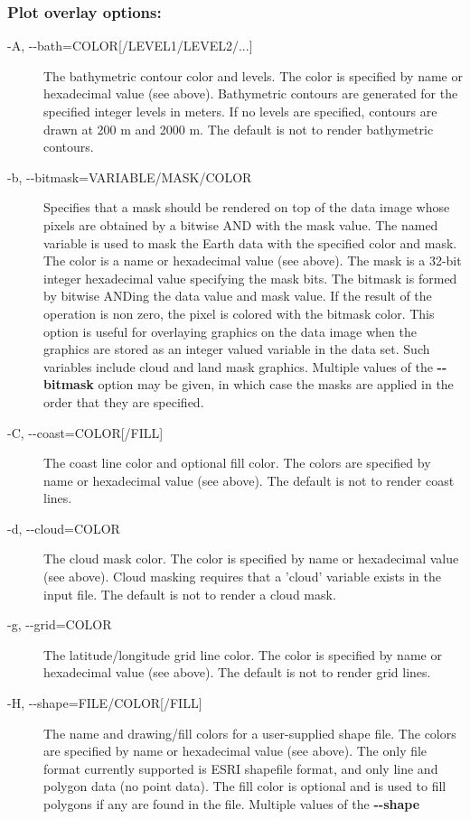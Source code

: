 \subsubsection*{Plot overlay options:}
\begin{description}
\item[-A, -{-}bath=COLOR[/LEVEL1/LEVEL2/...{]}]The bathymetric contour color and levels. The color is specified by name or hexadecimal value (see above). Bathymetric contours are generated for the specified integer levels in meters. If no levels are specified, contours are drawn at 200 m and 2000 m. The default is not to render bathymetric contours.
\item[-b, -{-}bitmask=VARIABLE/MASK/COLOR]Specifies that a mask should be rendered on top of the data image whose pixels are obtained by a bitwise AND with the mask value. The named variable is used to mask the Earth data with the specified color and mask. The color is a name or hexadecimal value (see above). The mask is a 32-bit integer hexadecimal value specifying the mask bits. The bitmask is formed by bitwise ANDing the data value and mask value. If the result of the operation is non zero, the pixel is colored with the bitmask color. This option is useful for overlaying graphics on the data image when the graphics are stored as an integer valued variable in the data set. Such variables include cloud and land mask graphics. Multiple values of the \textbf{-{-}bitmask}
 option may be given, in which case the masks are applied in the order that they are specified.
\item[-C, -{-}coast=COLOR[/FILL{]}]The coast line color and optional fill color. The colors are specified by name or hexadecimal value (see above). The default is not to render coast lines.
\item[-d, -{-}cloud=COLOR]The cloud mask color. The color is specified by name or hexadecimal value (see above). Cloud masking requires that a 'cloud' variable exists in the input file. The default is not to render a cloud mask.
\item[-g, -{-}grid=COLOR]The latitude/longitude grid line color. The color is specified by name or hexadecimal value (see above). The default is not to render grid lines.
\item[-H, -{-}shape=FILE/COLOR[/FILL{]}]The name and drawing/fill colors for a user-supplied shape file. The colors are specified by name or hexadecimal value (see above). The only file format currently supported is ESRI shapefile format, and only line and polygon data (no point data). The fill color is optional and is used to fill polygons if any are found in the file. Multiple values of the \textbf{-{-}shape}

\end{description}
